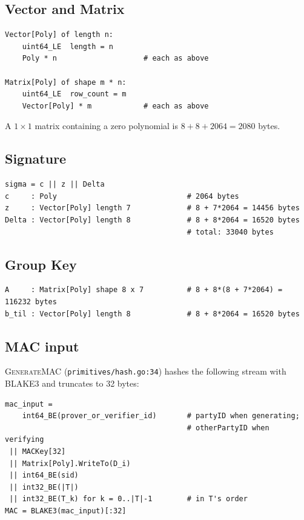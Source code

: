 \subsection{Vector and Matrix}

\begin{lstlisting}[caption={Vector and Matrix wire formats.}]
Vector[Poly] of length n:
    uint64_LE  length = n
    Poly * n                    # each as above

Matrix[Poly] of shape m * n:
    uint64_LE  row_count = m
    Vector[Poly] * m            # each as above
\end{lstlisting}

A $1 \times 1$ matrix containing a zero polynomial is $8 + 8 + 2064 = 2080$ bytes.

\subsection{Signature}

\begin{lstlisting}[caption={Signature $\sigma = (c, z, \Delta)$ with $n_{\textrm{vec}} = 7$, $m_{\textrm{pk}} = 8$.}]
sigma = c || z || Delta
c     : Poly                              # 2064 bytes
z     : Vector[Poly] length 7             # 8 + 7*2064 = 14456 bytes
Delta : Vector[Poly] length 8             # 8 + 8*2064 = 16520 bytes
                                          # total: 33040 bytes
\end{lstlisting}

\subsection{Group Key}

\begin{lstlisting}[caption={Group key $(A, \tilde b)$.}]
A     : Matrix[Poly] shape 8 x 7          # 8 + 8*(8 + 7*2064) = 116232 bytes
b_til : Vector[Poly] length 8             # 8 + 8*2064 = 16520 bytes
\end{lstlisting}

\subsection{MAC input}

\textsc{GenerateMAC} (\texttt{primitives/hash.go:34}) hashes the following stream with BLAKE3 and truncates to 32 bytes:

\begin{lstlisting}[caption={MAC input layout.}]
mac_input =
    int64_BE(prover_or_verifier_id)       # partyID when generating;
                                          # otherPartyID when verifying
 || MACKey[32]
 || Matrix[Poly].WriteTo(D_i)
 || int64_BE(sid)
 || int32_BE(|T|)
 || int32_BE(T_k) for k = 0..|T|-1        # in T's order
MAC = BLAKE3(mac_input)[:32]
\end{lstlisting}

